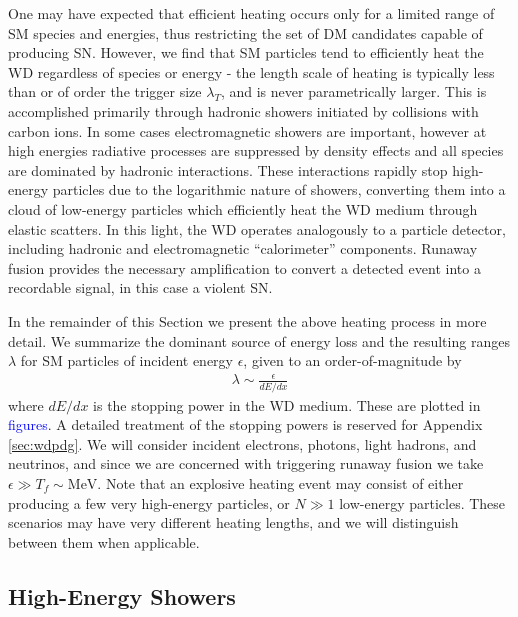 \documentclass[twocolumn, preprintnumbers,amsmath,amssymb,prd, superscriptaddress]{revtex4}
\begin{document}
One may have expected that efficient heating occurs only for a limited range of SM species and energies, thus restricting the set of DM candidates capable of producing SN.
However, we find that SM particles tend to efficiently heat the WD regardless of species or energy - the length scale of heating is typically less than or of order the trigger size $\lambda_T$, and is never parametrically larger.
This is accomplished primarily through hadronic showers initiated by collisions with carbon ions.
In some cases electromagnetic showers are important, however at high energies radiative processes are suppressed by density effects and all species are dominated by hadronic interactions.
These interactions rapidly stop high-energy particles due to the logarithmic nature of showers, converting them into a cloud of low-energy particles which efficiently heat the WD medium through elastic scatters.
In this light, the WD operates analogously to a particle detector, including hadronic and electromagnetic ``calorimeter'' components.
Runaway fusion provides the necessary amplification to convert a detected event into a recordable signal, in this case a violent SN.

In the remainder of this Section we present the above heating process in more detail.
We summarize the dominant source of energy loss and the resulting ranges $\lambda$ for SM particles of incident energy $\epsilon$, given to an order-of-magnitude by
\begin{align}
    \lambda \sim \frac{\epsilon}{dE/dx}
\end{align}
where $dE/dx$ is the stopping power in the WD medium.
These are plotted in \textcolor{blue}{figures}.
A detailed treatment of the stopping powers is reserved for Appendix \ref{sec:wdpdg}.
We will consider incident electrons, photons, light hadrons, and neutrinos, and since we are concerned with triggering runaway fusion we take $\epsilon \gg T_f \sim \text{MeV}$.
Note that an explosive heating event may consist of either producing a few very high-energy particles, or $N \gg 1$ low-energy particles.
These scenarios may have very different heating lengths, and we will distinguish between them when applicable.

\subsection{High-Energy Showers}
\end{document}
